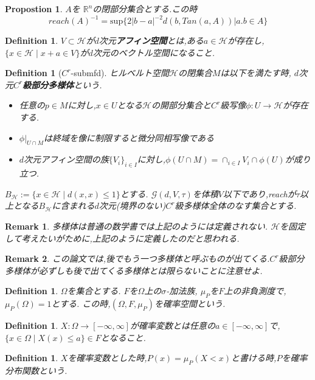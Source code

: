 \documentclass{ujarticle}
\newtheorem{dfn}[thm]{Definition}
\newtheorem{prop}[thm]{Propostion}
\newtheorem*{rem}{Remark}
\newcommand{\gdvt}{\mathcal{G}(d,V,\tau)}
\begin{document}
\begin{prop} $A$を $\mathbb{R}^n$の閉部分集合とする.この時
  \begin{equation*}
   reach(A)^{-1}=\mathrm{sup}\{2|b-a|^{-2}d(b,Tan(a,A)) | a.b \in A\}
  \end{equation*}
\end{prop}
\begin{dfn}
 $V \subset \mathcal{H}$が$d$次元\textbf{アフィン空間}とは,ある$a \in \mathcal{H}$が存在し,$\{ x \in \mathcal{H} \mid x + a \in V \}$が$d$次元のベクトル空間になること.
\end{dfn}
\begin{dfn}[$C^r$-submfd]
ヒルベルト空間$\mathcal{H}$の閉集合$M$は以下を満たす時,
$d$次元$C^r$\textbf{級部分多様体}という.
\begin{itemize}
  \item 任意の$p \in M$に対し,$x \in U$となる$\mathcal{H}$の開部分集合と$C^r$級写像$\phi:U \to \mathcal{H}$が存在する.
  \item $\phi|_{U \cap M}$は終域を像に制限すると微分同相写像である
  \item $d$次元アフィン空間の族$\{ V_i \}_{i \in I}$に対し,$\phi(U \cap M)=\cap_{i \in I} V_i \cap \phi(U)$が成り立つ.
\end{itemize}
  $B_{\mathcal{H}}:= \{ x \in \mathcal{H} \mid d(x,x) \le 1 \}$とする.
$\gdvt$を体積$V$以下であり,reachが$\tau$以上となる$B_{\mathcal{H}}$に含まれる$d$次元(境界のない)$C^r$級多様体全体のなす集合とする.

\end{dfn}
\begin{rem}
 多様体は普通の数学書では上記のようには定義されない.
 $\mathcal{H}$を固定して考えたいがために,上記のように定義したのだと思われる.
\end{rem}
\begin{rem}
 この論文では,後でもう一つ多様体と呼ぶものが出てくる.$C^r$級部分多様体が必ずしも後で出てくる多様体とは限らないことに注意せよ.
\end{rem}

\begin{dfn}
 $\Omega$を集合とする.
 $F$を$\Omega$上の$\sigma$-加法族,
 $\mu_P$を$F$上の非負測度で,$\mu_P(\Omega)=1$とする.
 この時,$(\Omega,F,\mu_P)$を確率空間という.
\end{dfn}
\begin{dfn}
 $X:\Omega \to [-\infty,\infty]$が確率変数とは任意の$a \in [-\infty,\infty]$で,$\{x \in \Omega \mid X(x) \le a \} \in F$となること.
\end{dfn}
\begin{dfn}
 $X$を確率変数とした時,$P(x) = \mu_P(X <x)$と書ける時,$P$を確率分布関数という.
\end{dfn}
\end{document}
